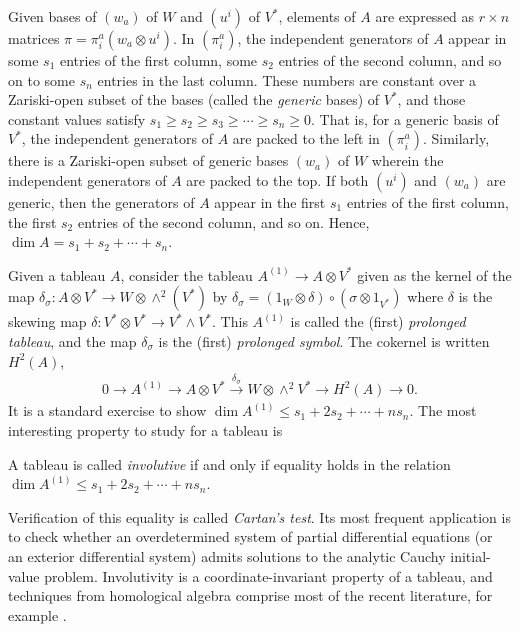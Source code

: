 \documentclass[pdftex]{sigma}
\numberwithin{equation}{section}
\begin{document}
Given bases of $(w_a)$ of $W$ and $(u^i)$ of $V^*$, elements of $A$ are expressed as $r \times n$
matrices $\pi = \pi^a_i (w_a \otimes u^i)$.
In $(\pi^a_i)$, the independent generators of $A$ appear in some $s_1$ entries of the f\/irst
column, some $s_2$ entries of the second column, and so on to some $s_n$
entries in the last column.
These numbers are constant over a Zariski-open subset of the bases (called the
\textit{generic} bases) of $V^*$, and those constant values satisfy $s_1
\geq s_2 \geq s_3 \geq \cdots \geq s_n \geq 0$.  That is, for a generic basis
of $V^*$, the independent generators of $A$ are packed to the left in $(\pi^a_i)$.
Similarly, there is a Zariski-open subset of generic bases $(w_a)$ of $W$
wherein the independent
generators of $A$ are packed to the top.  If both $(u^i)$ and $(w_a)$ are
generic, then the generators of $A$ appear in the f\/irst $s_1$ entries of the
f\/irst column, the f\/irst $s_2$ entries of the second column, and so on.
Hence, $\dim A = s_1 + s_2 + \cdots + s_n$.

Given a tableau $A$, consider the tableau $A^{(1)} \to  A\otimes V^*$ given as the kernel of
the map $\delta_\sigma\colon A \otimes V^* \to W \otimes \wedge^2 (V^*)$ by
$\delta_\sigma = (1_W \otimes \delta)\circ(\sigma \otimes 1_{V^*})$ where $\delta$ is
the skewing map $\delta\colon V^* \otimes V^* \to V^* \wedge V^*$.
This $A^{(1)}$ is called the (f\/irst) \textit{prolonged tableau}, and the map
$\delta_\sigma$ is the (f\/irst) \textit{prolonged symbol}.  The cokernel is
written $H^{2}(A)$,
\begin{gather*}
0 \longrightarrow A^{(1)} \longrightarrow A \otimes V^* \overset{\delta_\sigma}{\longrightarrow} W \otimes
\wedge^2 V^* \longrightarrow H^2(A) \longrightarrow 0.
\label{spencer2}
\end{gather*}
It is a standard exercise to show
$\dim A^{(1)} \leq s_1 + 2s_2 + \cdots + n s_n$.
The most interesting property to study for a tableau is
\begin{Definition}[involutivity]
A tableau is called \emph{involutive} if and only if equality holds in the relation
$\dim A^{(1)} \leq s_1 + 2s_2 + \cdots + ns_n$.
\end{Definition}

Verif\/ication of this equality is called \textit{Cartan's test}. Its most
frequent application is to check whether an overdetermined system of partial
dif\/ferential equations (or an exterior dif\/ferential system) admits solutions to
the analytic Cauchy initial-value problem. Involutivity is a coor\-di\-na\-te-invariant property of a tableau,
and techniques from homological algebra comprise most of the
recent literature, for example \cite{CGG2009, Kruglikov2007, Malgrange2003}.
\end{document}
